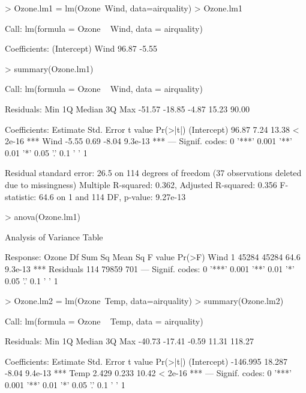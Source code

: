 \begin{Schunk}
\begin{Sinput}
> Ozone.lm1 = lm(Ozone~Wind, data=airquality) 
> Ozone.lm1 
\end{Sinput}
\begin{Soutput}

Call:
lm(formula = Ozone ~ Wind, data = airquality)

Coefficients:
(Intercept)         Wind  
      96.87        -5.55  
\end{Soutput}
\begin{Sinput}
> summary(Ozone.lm1) 
\end{Sinput}
\begin{Soutput}

Call:
lm(formula = Ozone ~ Wind, data = airquality)

Residuals:
   Min     1Q Median     3Q    Max 
-51.57 -18.85  -4.87  15.23  90.00 

Coefficients:
            Estimate Std. Error t value Pr(>|t|)    
(Intercept)    96.87       7.24   13.38  < 2e-16 ***
Wind           -5.55       0.69   -8.04  9.3e-13 ***
---
Signif. codes:  
0 '***' 0.001 '**' 0.01 '*' 0.05 '.' 0.1 ' ' 1

Residual standard error: 26.5 on 114 degrees of freedom
  (37 observations deleted due to missingness)
Multiple R-squared:  0.362,	Adjusted R-squared:  0.356 
F-statistic: 64.6 on 1 and 114 DF,  p-value: 9.27e-13
\end{Soutput}
\begin{Sinput}
> anova(Ozone.lm1) 
\end{Sinput}
\begin{Soutput}
Analysis of Variance Table

Response: Ozone
           Df Sum Sq Mean Sq F value  Pr(>F)    
Wind        1  45284   45284    64.6 9.3e-13 ***
Residuals 114  79859     701                    
---
Signif. codes:  
0 '***' 0.001 '**' 0.01 '*' 0.05 '.' 0.1 ' ' 1
\end{Soutput}
\begin{Sinput}
> Ozone.lm2 = lm(Ozone~Temp, data=airquality) 
> summary(Ozone.lm2) 
\end{Sinput}
\begin{Soutput}

Call:
lm(formula = Ozone ~ Temp, data = airquality)

Residuals:
   Min     1Q Median     3Q    Max 
-40.73 -17.41  -0.59  11.31 118.27 

Coefficients:
            Estimate Std. Error t value Pr(>|t|)    
(Intercept) -146.995     18.287   -8.04  9.4e-13 ***
Temp           2.429      0.233   10.42  < 2e-16 ***
---
Signif. codes:  
0 '***' 0.001 '**' 0.01 '*' 0.05 '.' 0.1 ' ' 1


\end{Soutput}
\end{Schunk}
